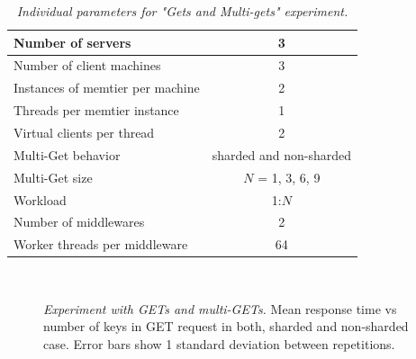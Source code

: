 \documentclass[11pt,a4paper]{article}
\begin{document}
\begin{center}
	\scriptsize{	
		\begin{table}[!ht]
			\centering
			\begin{tabulary}{\linewidth}{ | L | C |}
				\hline Number of servers				&	3	\\
				\hline Number of client machines		&	3	\\
				\hline Instances of memtier per machine	&	2	\\
				\hline Threads per memtier instance		&	1	\\
				\hline Virtual clients per thread		&	2	\\
				\hline Multi-Get behavior               & sharded and non-sharded  \\
				\hline Multi-Get size                   & $N$ = {1, 3, 6, 9}   \\
				\hline Workload							&	1:$N$	\\
				\hline Number of middlewares			&	2	\\
				\hline Worker threads per middleware	&	64	\\
				\hline 
			\end{tabulary}
			\caption{\textit{Individual parameters for "Gets and Multi-gets" experiment.}}
			\label{table:gets:params}
		\end{table}
	}
\end{center}

\begin{figure}[ht!]
	\centering	
	\hfill
	\\
	\caption{\textit{Experiment with GETs and multi-GETs.} Mean response time vs number of keys in GET request in both, sharded and non-sharded case. Error bars show 1 standard deviation between repetitions.}
	\label{Figure:experiment_gets}	
\end{figure}
\end{document}
